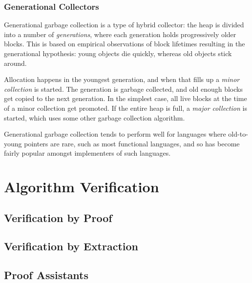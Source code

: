 \subsubsection{Generational Collectors}

Generational garbage collection is a type of hybrid collector: the
heap is divided into a number of \textit{generations}, where each
generation holds progressively older blocks. This is based on
empirical observations of block lifetimes resulting in the
generational hypothesis: young objects die quickly, whereas old
objects stick around\cite{Ungar84}.

Allocation happens in the youngest generation, and when that fills up
a \textit{minor collection} is started. The generation is garbage
collected, and old enough blocks get copied to the next generation. In
the simplest case, all live blocks at the time of a minor collection
get promoted. If the entire heap is full, a \textit{major collection}
is started, which uses some other garbage collection
algorithm\cite{GarbageCollection}.

Generational garbage collection tends to perform well for languages
where old-to-young pointers are rare, such as most functional
languages, and so has become fairly popular amongst implementers of
such languages.

\section{Algorithm Verification}


\subsection{Verification by Proof}


\subsection{Verification by Extraction}


\subsection{Proof Assistants}

